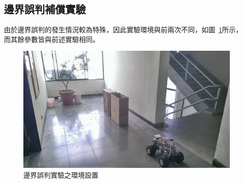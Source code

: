 \subsection{邊界誤判補償實驗}
由於邊界誤判的發生情況較為特殊，因此實驗環境與前兩次不同，如圖~\ref{f:exp:closest_env}所示，
而其餘參數皆與前述實驗相同。
\begin{figure}[h!]
	\centering
	\includegraphics[width=\textwidth]{figures/experiments/closest_env_real}
	\caption{邊界誤判實驗之環境設置}
	\label{f:exp:closest_env}
\end{figure}

